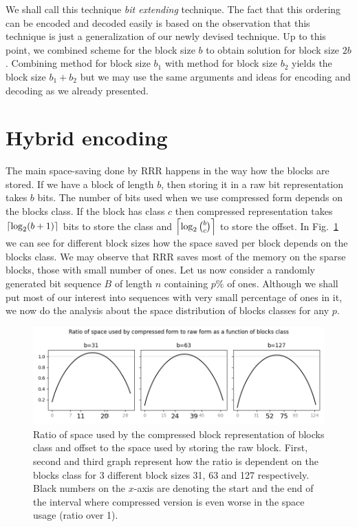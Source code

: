 We shall call this technique \textit{bit extending} technique. The fact that this
ordering can be encoded and decoded easily is based on the observation that this technique
is just a generalization of our newly devised technique. Up to this point, we combined
scheme for the block size $b$ to obtain solution for block size $2b$. Combining method
for block size $b_1$ with method for block size $b_2$ yields the block size $b_1+b_2$
but we may use the same arguments and ideas for encoding and decoding as we already presented. 

\section{Hybrid encoding}


The main space-saving done by RRR happens in the way how the blocks are stored. If we have
a block of length $b$, then storing it in a raw bit representation takes $b$ bits.
The number of bits used when we use compressed form depends on the blocks class. If the block
has class $c$ then compressed representation takes $\left\lceil \log_2 (b+1) \right\rceil$ bits to store the
class and $\left\lceil \log_2{b\choose c} \right\rceil$ to store the offset. In
Fig.~\ref{obr:rrrSpaceSavings} we can see for different block sizes how the space saved
per block depends on the blocks class. We may observe that RRR saves most of the memory on the
sparse blocks, those with small number of ones. Let us now consider a randomly
generated bit sequence $B$ of length $n$ containing $p\%$ of ones. Although we shall put most of
our interest into sequences with very small percentage of ones in it, we now do the analysis
about the space distribution of blocks classes for any $p$.

\begin{figure}
	\centerline{
		\includegraphics[width=\textwidth]{images/rrr_space_savings}
	}
	\caption[TODO]{Ratio of space used by the compressed
    block representation of blocks class and offset to the space used by storing the raw
    block. First, second and third graph represent how the ratio is dependent on the blocks
    class for 3 different block sizes 31, 63 and 127 respectively. Black numbers on the $x$-axis
    are denoting the start and the end of the interval where compressed version is even worse
    in the space usage (ratio over 1).
	}
	\label{obr:rrrSpaceSavings}
\end{figure}

